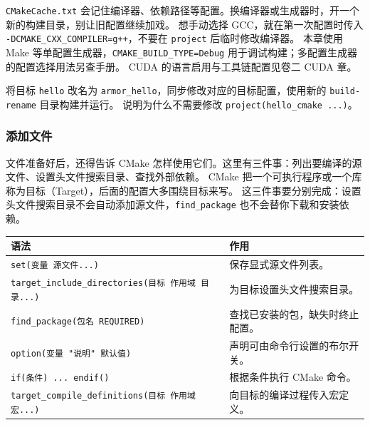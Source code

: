 \begin{note}
\texttt{CMakeCache.txt} 会记住编译器、依赖路径等配置。换编译器或生成器时，开一个新的构建目录，别让旧配置继续加戏。
想手动选择 GCC，就在第一次配置时传入 \texttt{-DCMAKE\_CXX\_COMPILER=g++}，不要在 \texttt{project} 后临时修改编译器。
本章使用 Make 等单配置生成器，\texttt{CMAKE\_BUILD\_TYPE=Debug} 用于调试构建；多配置生成器的配置选择用法另查手册。
CUDA 的语言启用与工具链配置见卷二 CUDA 章。
\end{note}

\begin{exercise}\label{ex:v1-build-target-name}
将目标 \texttt{hello} 改名为 \texttt{armor\_hello}，同步修改对应的目标配置，使用新的 \texttt{build-rename} 目录构建并运行。
说明为什么不需要修改 \texttt{project(hello\_cmake ...)}。
\end{exercise}

\subsubsection{添加文件}
\label{sec:cmake-files}

文件准备好后，还得告诉 CMake 怎样使用它们。这里有三件事：列出要编译的源文件、设置头文件搜索目录、查找外部依赖。
CMake 把一个可执行程序或一个库称为目标（Target），后面的配置大多围绕目标来写。
这三件事要分别完成：设置头文件搜索目录不会自动添加源文件，\texttt{find\_package} 也不会替你下载和安装依赖。

\begin{center}
\begin{tabular}{p{}p{}}
\toprule[1.5pt]
语法 & 作用 \\
\midrule[1pt]
\texttt{set(变量 源文件...)} & 保存显式源文件列表。\\
\texttt{target\_include\_directories(目标 作用域 目录...)} & 为目标设置头文件搜索目录。\\
\texttt{find\_package(包名 REQUIRED)} & 查找已安装的包，缺失时终止配置。\\
\texttt{option(变量 "说明" 默认值)} & 声明可由命令行设置的布尔开关。\\
\texttt{if(条件) ... endif()} & 根据条件执行 CMake 命令。\\
\texttt{target\_compile\_definitions(目标 作用域 宏...)} & 向目标的编译过程传入宏定义。\\
\bottomrule[1.5pt]
\end{tabular}
\end{center}

